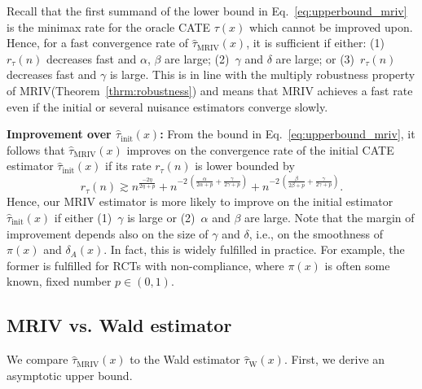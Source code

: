 \documentclass{article} %
\newcommand{\frameworkname}{MRIV\xspace}
\theoremstyle{definition}
\theoremstyle{plain}
\begin{document}
Recall that the first summand of the lower bound in Eq.~\eqref{eq:upperbound_mriv} is the minimax rate for the oracle CATE $\tau(x)$ which cannot be improved upon. Hence, for a fast convergence rate of $\hat{\tau}_{\mathrm{MRIV}}(x)$, it is sufficient if either: (1)~$r_{\tau}(n)$ decreases fast and $\alpha$, $\beta$ are large; (2)~$\gamma$ and $\delta$ are large; or (3)~$r_{\tau}(n)$ decreases fast and $\gamma$ is large. This is in line with the multiply robustness property of \frameworkname (Theorem~\ref{thrm:robustness}) and means that \frameworkname achieves a fast rate even if the initial or several nuisance estimators converge slowly.

\textbf{Improvement over $\hat{\tau}_{\mathrm{init}}(x)$:}
From the bound in Eq.~\eqref{eq:upperbound_mriv}, it follows that $\hat{\tau}_{\mathrm{MRIV}}(x)$ improves on the convergence rate of the initial CATE estimator $\hat{\tau}_{\mathrm{init}}(x)$ if its rate $r_{\tau}(n)$ is lower bounded by
\begin{equation}\label{eq:lowerbound_mriv}
    r_{\tau}(n) \gtrsim n^{\frac{-2\eta}{2\eta+p}} + n^{-2 \, \left(\frac{\alpha}{2\alpha+p}+\frac{\gamma}{2\gamma+p}\right)} +
    n^{-2\, \left(\frac{\beta}{2\beta+p}+\frac{\gamma}{2\gamma+p}\right)}.
\end{equation}
Hence, our \frameworkname estimator is more likely to improve on the initial estimator $\hat{\tau}_{\mathrm{init}}(x)$ if either (1)~$\gamma$ is large or (2)~$\alpha$ and $\beta$ are large. Note that the margin of improvement depends also on the size of $\gamma$ and $\delta$, i.e., on the smoothness of $\pi(x)$ and $\delta_A(x)$. In fact, this is widely fulfilled in practice. For example, the former is fulfilled for RCTs with non-compliance, where $\pi(x)$ is often some known, fixed number $p \in (0,1)$. %

\subsection{\frameworkname vs. Wald estimator} 

We compare $\hat{\tau}_{\mathrm{MRIV}}(x)$ to the Wald estimator $\hat{\tau}_{\mathrm{W}}(x)$. First, we derive an asymptotic upper bound.
\end{document}
